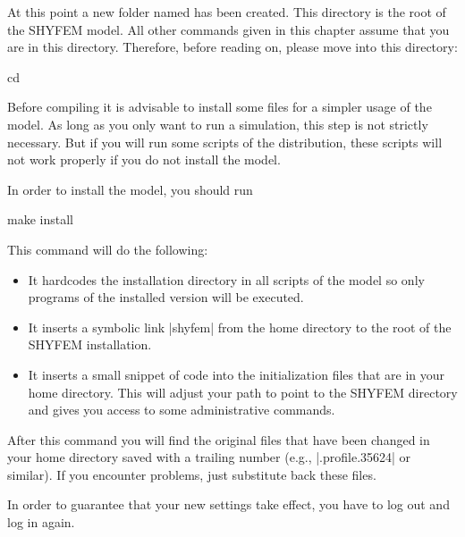 At this point a new folder named \ttt{\shydir} has been created. 
This directory is the root of the SHYFEM model. All other commands
given in this chapter assume that you are in this directory. 
Therefore, before reading on, please move into this directory:

\begin{codem}
    cd \shydir
\end{codem}


\newcommand{\sysfiles}{.bashrc .bash\_profile .profile}

Before compiling it is advisable to install some files for a simpler
usage of the model. As long as you only want to run a simulation, this
step is not strictly necessary. But if you will run some scripts of the
distribution, these scripts will not work properly if you do not install
the model.

In order to install the model, you should run

\begin{code}
    make install
\end{code}

This command will do the following:

\begin{itemize}

\item It hardcodes the installation directory in all scripts of the
model so only programs of the installed version will be executed.

\item It inserts a symbolic link |shyfem| from the home directory to
the root of the SHYFEM installation.

\item It inserts a small snippet of code into the initialization files
\ttt{\sysfiles} that are in your home directory. This will adjust your
path to point to the SHYFEM directory and gives you access to some
administrative commands.

\end{itemize}

After this command you will find the original files that have been changed
in your home directory saved with a trailing number (e.g., |.profile.35624|
or similar).  If you encounter problems, just substitute back these files.

In order to guarantee that your new settings take effect, you have to log
out and log in again.

